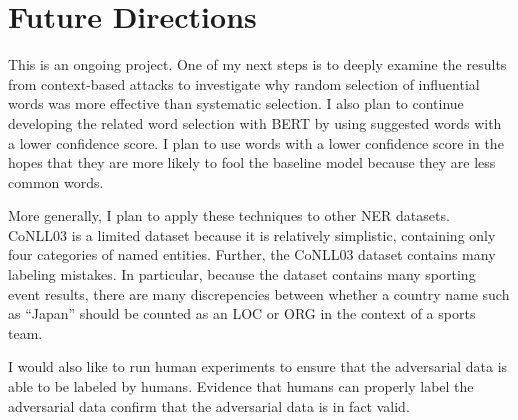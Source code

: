 \section{Future Directions}
This is an ongoing project. One of my next steps is to deeply examine the results from context-based attacks to investigate why random selection of influential words was more effective than systematic selection. I also plan to continue developing the related word selection with BERT by using suggested words with a lower confidence score. I plan to use words with a lower confidence score in the hopes that they are more likely to fool  the baseline model because they are less common words.

More generally, I plan to apply these techniques to other NER datasets. CoNLL03 is a limited dataset because it is relatively simplistic, containing only four categories of named entities. Further, the CoNLL03 dataset contains many labeling mistakes. In particular, because the dataset contains many sporting event results, there are many discrepencies between whether a country name such as ``Japan'' should be counted as an \textsc{LOC} or \textsc{ORG} in the context of a sports team.

I would also like to run human experiments to ensure that the adversarial data is able to be labeled by humans. Evidence that humans can properly label the adversarial data confirm that the adversarial data is in fact valid.



